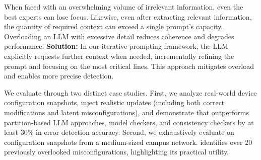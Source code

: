 

When faced with an overwhelming volume of irrelevant information, even the best experts can lose focus. Likewise, even after extracting relevant information, the quantity of required context can exceed a single prompt's capacity. Overloading an LLM with excessive detail reduces coherence and degrades performance. \textbf{Solution:} In our iterative prompting framework, the LLM explicitly requests further context when needed, incrementally refining the prompt and focusing on the most critical lines. This approach mitigates overload and enables more precise detection.

We evaluate \sysname{} through two distinct case studies. First, we analyze real-world device configuration snapshots, inject realistic updates (including both correct modifications and latent misconfigurations), and demonstrate that \sysname{} outperforms partition-based LLM approaches, model checkers, and consistency checkers by at least 30\% in error detection accuracy. Second, we exhaustively evaluate \sysname{} on configuration snapshots from a medium-sized campus network. \sysname{} identifies over 20 previously overlooked misconfigurations, highlighting its practical utility.

